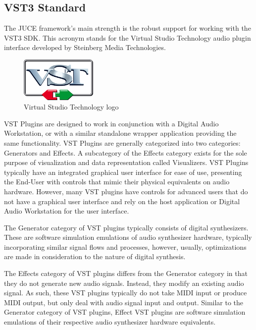 \documentclass[a4paper,12pt]{report}
\begin{document}
\subsection{VST3 Standard}
\label{subsec:vst3standard}
The JUCE framework's main strength is the robust support for working with the VST3 SDK. This acronym stands for the Virtual Studio Technology audio plugin interface developed by Steinberg Media Technologies. 

\begin{figure} \centering
\includegraphics[width=10em]{VST3Logo.png}
    \caption{Virtual Studio Technology logo}     \label{fig:VST3Logo} \end{figure}

VST Plugins are designed to work in conjunction with a Digital Audio Workstation, or with a similar standalone wrapper application providing the same functionality. VST Plugins are generally categorized into two categories: Generators and Effects. A subcategory of the Effects category exists for the sole purpose of visualization and data representation called Visualizers. VST Plugins typically have an integrated graphical user interface for ease of use, presenting the End-User with controls that mimic their physical equivalents on audio hardware. However, many VST plugins have controls for advanced users that do not have a graphical user interface and rely on the host application or Digital Audio Workstation for the user interface.

The Generator category of VST plugins typically consists of digital synthesizers. These are software simulation emulations of audio synthesizer hardware, typically incorporating similar signal flows and processes, however, usually, optimizations are made in consideration to the nature of digital synthesis. 

The Effects category of VST plugins differs from the Generator category in that they do not generate new audio signals. Instead, they modify an existing audio signal. As such, these VST plugins typically do not take MIDI input or produce MIDI output, but only deal with audio signal input and output. Similar to the Generator category of VST plugins, Effect VST plugins are software simulation emulations of their respective audio synthesizer hardware equivalents.
\end{document}

